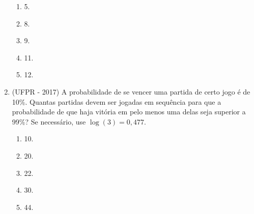 \begin{enumerate}
\begin{enumerate}
\item 5. 
\item 8. 
\item 9.
\item 11.
\item 12.
\end{enumerate}


%

\item \label{Exer15} (UFPR - 2017) A probabilidade de se vencer uma partida de certo jogo é de 10{\%}. Quantas partidas devem ser 
jogadas em sequência para que a probabilidade de que haja vitória em pelo menos uma delas seja superior a 99{\%}? Se 
necessário, use $\log(3) = 0{,}477$.
\begin{enumerate}
\item 10.
\item 20.
\item 22.
\item 30.
\item 44.

\end{enumerate}

\end{enumerate}

